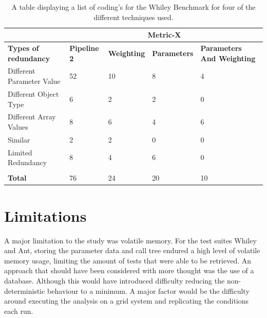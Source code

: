 \documentclass[11pt
              , a4paper
              , twoside
              , openright
              ]{report}
\begin{document}
\begin{table}[]
\centering
\begin{tabular}{|l|l|l|l|l|}
\hline
                             & \multicolumn{4}{c|}{\textbf{Metric-X}}                                                              \\ \hline
\textbf{Types of redundancy} & \textbf{Pipeline 2} & \textbf{Weighting} & \textbf{Parameters} & \textbf{Parameters  And Weighting} \\ \hline
Different Parameter Value    & 52                  & 10                 & 8                   & 4                                  \\ \hline
Different Object Type        & 6                   & 2                  & 2                   & 0                                  \\ \hline
Different Array Values       & 8                   & 6                  & 4                   & 6                                  \\ \hline
Similar                      & 2                   & 2                  & 0                   & 0                                  \\ \hline
Limited Redundancy           & 8                   & 4                  & 6                   & 0                                  \\ \hline
\textbf{}                    &                     &                    &                     &                                    \\ \hline
\textbf{Total}               & 76                  & 24                 & 20                  & 10                                 \\ \hline
\end{tabular}
\caption{A table displaying a list of coding's for the Whiley Benchmark for four of the different techniques used.}
\label{metriccoding}
\end{table}

\section{Limitations}

A major limitation to the study was volatile memory. For the test suites Whiley and Ant, storing the parameter data and call tree endured a high level of volatile memory usage, limiting the amount of tests that were able to be retrieved. An approach that should have been considered with more thought was the use of a database. Although this would have introduced difficulty reducing the non-deterministic behaviour to a minimum. A major factor would be the difficulty around executing the analysis on a grid system and replicating the conditions each run.
\end{document}
